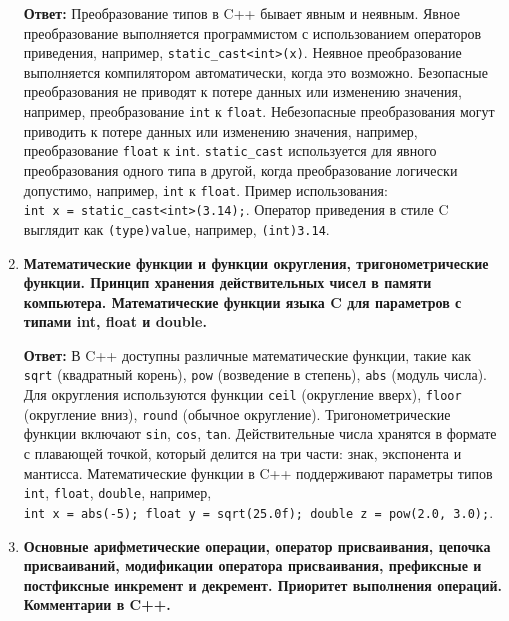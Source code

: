 \documentclass[
]{article}
\begin{document}
\begin{enumerate}
  \textbf{Ответ:} Преобразование типов в C++ бывает явным и неявным.
  Явное преобразование выполняется программистом с использованием
  операторов приведения, например,
  \texttt{static\_cast\textless{}int\textgreater{}(x)}. Неявное
  преобразование выполняется компилятором автоматически, когда это
  возможно. Безопасные преобразования не приводят к потере данных или
  изменению значения, например, преобразование \texttt{int} к
  \texttt{float}. Небезопасные преобразования могут приводить к потере
  данных или изменению значения, например, преобразование \texttt{float}
  к \texttt{int}. \texttt{static\_cast} используется для явного
  преобразования одного типа в другой, когда преобразование логически
  допустимо, например, \texttt{int} к \texttt{float}. Пример
  использования:
  \texttt{int\ x\ =\ static\_cast\textless{}int\textgreater{}(3.14);}.
  Оператор приведения в стиле C выглядит как \texttt{(type)value},
  например, \texttt{(int)3.14}.
\item
  \textbf{Математические функции и функции округления,
  тригонометрические функции. Принцип хранения действительных чисел в
  памяти компьютера. Математические функции языка C для параметров с
  типами int, float и double.}

  \textbf{Ответ:} В C++ доступны различные математические функции, такие
  как \texttt{sqrt} (квадратный корень), \texttt{pow} (возведение в
  степень), \texttt{abs} (модуль числа). Для округления используются
  функции \texttt{ceil} (округление вверх), \texttt{floor} (округление
  вниз), \texttt{round} (обычное округление). Тригонометрические функции
  включают \texttt{sin}, \texttt{cos}, \texttt{tan}. Действительные
  числа хранятся в формате с плавающей точкой, который делится на три
  части: знак, экспонента и мантисса. Математические функции в C++
  поддерживают параметры типов \texttt{int}, \texttt{float},
  \texttt{double}, например,
  \texttt{int\ x\ =\ abs(-5);\ float\ y\ =\ sqrt(25.0f);\ double\ z\ =\ pow(2.0,\ 3.0);}.
\item
  \textbf{Основные арифметические операции, оператор присваивания,
  цепочка присваиваний, модификации оператора присваивания, префиксные и
  постфиксные инкремент и декремент. Приоритет выполнения операций.
  Комментарии в C++.}


\end{enumerate}
\end{document}
